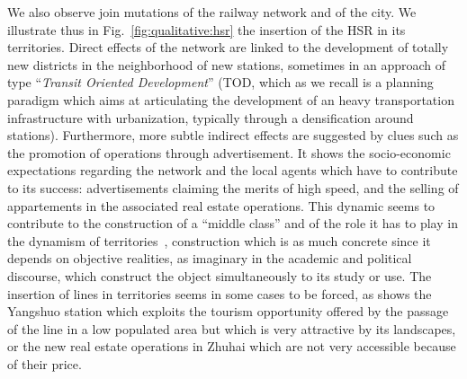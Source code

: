 We also observe join mutations of the railway network and of the city. We illustrate thus in Fig.~\ref{fig:qualitative:hsr} the insertion of the HSR in its territories. Direct effects of the network are linked to the development of totally new districts in the neighborhood of new stations, sometimes in an approach of type ``\emph{Transit Oriented Development}'' (TOD, which as we recall is a planning paradigm which aims at articulating the development of an heavy transportation infrastructure with urbanization, typically through a densification around stations). Furthermore, more subtle indirect effects are suggested by clues such as the promotion of operations through advertisement. It shows the socio-economic expectations regarding the network and the local agents which have to contribute to its success: advertisements claiming the merits of high speed, and the selling of appartements in the associated real estate operations. This dynamic seems to contribute to the construction of a ``middle class'' and of the role it has to play in the dynamism of territories~\citep{rocca2008power}, construction which is as much concrete since it depends on objective realities, as imaginary in the academic and political discourse, which construct the object simultaneously to its study or use. The insertion of lines in territories seems in some cases to be forced, as shows the Yangshuo station which exploits the tourism opportunity offered by the passage of the line in a low populated area but which is very attractive by its landscapes, or the new real estate operations in Zhuhai which are not very accessible because of their price.


